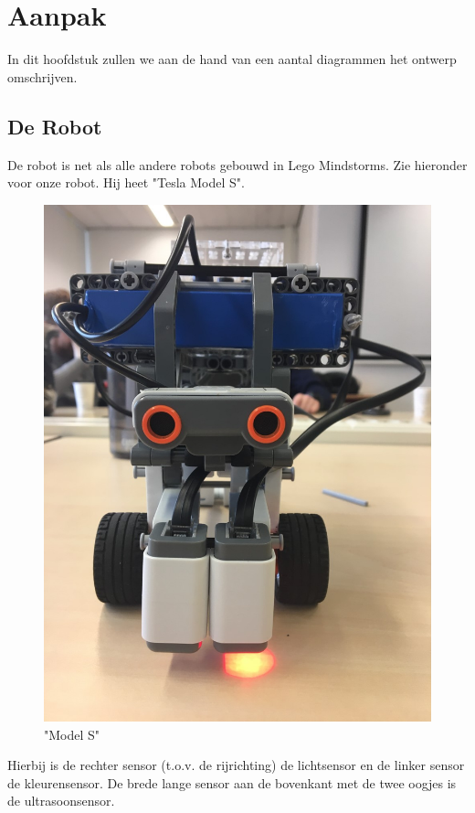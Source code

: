 \documentclass[12pt]{article}
\begin{document}
\section{Aanpak}
	In dit hoofdstuk zullen we aan de hand van een aantal diagrammen het ontwerp omschrijven.
	\subsection{De Robot}
		De robot is net als alle andere robots gebouwd in Lego Mindstorms. Zie hieronder voor onze robot. Hij heet "Tesla Model S".
		\begin{center}
			\begin{figure}
				\includegraphics[scale=0.3]{TeslaModelS}	
				\caption{"Model S"}
			\end{figure}
		\end{center}
		Hierbij is de rechter sensor (t.o.v. de rijrichting) de lichtsensor en de linker sensor de kleurensensor. De brede lange sensor aan de bovenkant met de twee oogjes is de ultrasoonsensor.
\end{document}
